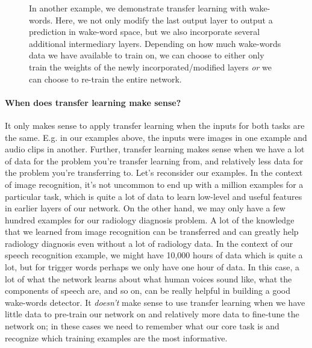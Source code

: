 \documentclass[12pt]{article}
\begin{document}
\begin{figure}[h]
\caption{\footnotesize In another example, we demonstrate transfer learning with wake-words. Here, we not only modify the last output layer to 
output a prediction in wake-word space, but we also incorporate several additional intermediary layers. Depending on how much
wake-words data we have available to train on, we can choose to either only train the weights of the newly incorporated/modified layers \emph{or} we can choose to re-train the entire network.}
\end{figure}

\paragraph{When does transfer learning make sense?}
It only makes sense to apply transfer learning when the inputs for both tasks are the same. E.g. in our examples above, the inputs were images in one example and audio clips in another. Further, transfer learning makes sense when we have a lot of data for the problem you're transfer learning from, and relatively less data for the problem you're transferring to. Let's reconsider our examples. In the context of image recognition, it's not uncommon to end up with a million examples for a particular task, which is quite a lot of data to learn low-level and useful features in earlier layers of our network. On the other hand, we may only have a few hundred examples for our radiology diagnosis
problem. A lot of the knowledge that we learned from image recognition can be transferred and can greatly help radiology
diagnosis even without a lot of radiology data. In the context of our speech recognition example, 
we might have 10,000 hours of data which is quite a lot, but for trigger words perhaps we only have one hour of data. In this case,
a lot of what the network learns about what human voices sound like, what the components of speech are, and so on,
can be really helpful in building a good wake-words detector. It \emph{doesn't} make sense to use transfer learning when we have little data to pre-train our network on and relatively more data to fine-tune the network on; in these cases we need to remember what
our core task is and recognize which training examples are the most informative.
\end{document}
